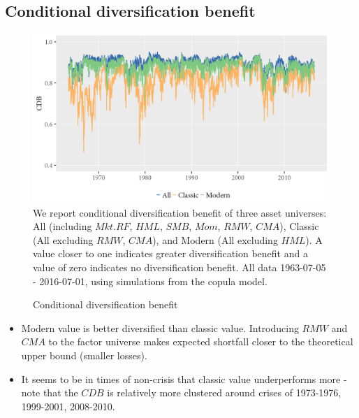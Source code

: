 \subsection{Conditional diversification benefit}
\begin{figure}[H]
  \caption{Conditional diversification benefit}
  \label{diag:cdb1}
  \toprule
  \centering
  \begin{minipage}{\textwidth}
  \includegraphics[scale=1]{graphics/CDB_dynamic_ghskt.png}  
  \bottomrule
  \vspace{3mm}
  \footnotesize
  We report conditional diversification benefit of three asset universes: All (including $Mkt.RF$, $HML$, $SMB$, $Mom$, $RMW$, $CMA$), Classic (All excluding $RMW$, $CMA$), and Modern (All excluding $HML$). A value closer to one indicates greater diversification benefit and a value of zero indicates no diversification benefit. All data 1963-07-05 - 2016-07-01, using simulations from the copula model.
  \end{minipage}
\end{figure}
\begin{itemize}
  \item Modern value is better diversified than classic value. Introducing $RMW$ and $CMA$ to the factor universe makes expected shortfall closer to the theoretical upper bound (smaller losses).
  \item It seems to be in times of non-crisis that classic value underperforms more - note that the $CDB$ is relatively more clustered around crises of 1973-1976, 1999-2001, 2008-2010.
\end{itemize}